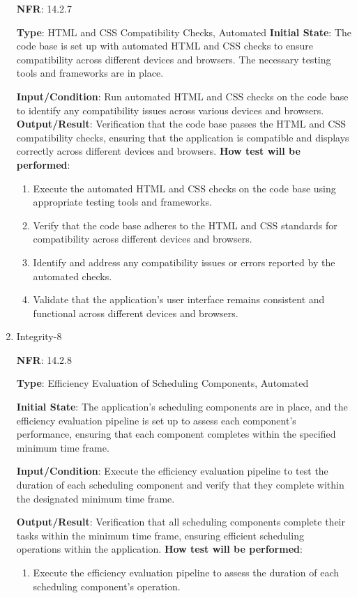 \documentclass[12pt, titlepage]{article}
\begin{document}
\begin{enumerate}
\textbf{NFR}: 14.2.7

\textbf{Type}: HTML and CSS Compatibility Checks, Automated
\textbf{Initial State}: The code base is set up with automated HTML and CSS checks to ensure compatibility across different devices and browsers. The necessary testing tools and frameworks are in place.


\textbf{Input/Condition}:  Run automated HTML and CSS checks on the code base to identify any compatibility issues across various devices and browsers.
\textbf{Output/Result}: Verification that the code base passes the HTML and CSS compatibility checks, ensuring that the application is compatible and displays correctly across different devices and browsers.
\textbf{How test will be performed}: 
\begin{enumerate}
    \item Execute the automated HTML and CSS checks on the code base using appropriate testing tools and frameworks.
    \item Verify that the code base adheres to the HTML and CSS standards for compatibility across different devices and browsers.
    \item Identify and address any compatibility issues or errors reported by the automated checks.

    \item Validate that the application's user interface remains consistent and functional across different devices and browsers.

\end{enumerate}


\item {Integrity-8\\}

\textbf{NFR}: 14.2.8

\textbf{Type}: Efficiency Evaluation of Scheduling Components, Automated

\textbf{Initial State}: The application's scheduling components are in place, and the efficiency evaluation pipeline is set up to assess each component's performance, ensuring that each component completes within the specified minimum time frame.



\textbf{Input/Condition}: Execute the efficiency evaluation pipeline to test the duration of each scheduling component and verify that they complete within the designated minimum time frame.

\textbf{Output/Result}: Verification that all scheduling components complete their tasks within the minimum time frame, ensuring efficient scheduling operations within the application.
\textbf{How test will be performed}: 
\begin{enumerate}
    \item Execute the efficiency evaluation pipeline to assess the duration of each scheduling component's operation.


\end{enumerate}
\end{enumerate}
\end{document}

